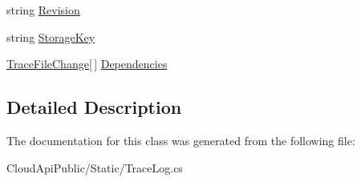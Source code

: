 \begin{DoxyCompactItemize}
\begin{DoxyCompactList}\small\item\em \end{DoxyCompactList}\item 
\hypertarget{class_cloud_api_public_1_1_static_1_1_trace_file_change_a029dfa11d6a6dc91af7f680418234749}{string \hyperlink{class_cloud_api_public_1_1_static_1_1_trace_file_change_a029dfa11d6a6dc91af7f680418234749}{Revision}}\label{class_cloud_api_public_1_1_static_1_1_trace_file_change_a029dfa11d6a6dc91af7f680418234749}

\begin{DoxyCompactList}\small\item\em \end{DoxyCompactList}\item 
\hypertarget{class_cloud_api_public_1_1_static_1_1_trace_file_change_a13935156660db1dd6d25d07a7de376af}{string \hyperlink{class_cloud_api_public_1_1_static_1_1_trace_file_change_a13935156660db1dd6d25d07a7de376af}{Storage\-Key}}\label{class_cloud_api_public_1_1_static_1_1_trace_file_change_a13935156660db1dd6d25d07a7de376af}

\begin{DoxyCompactList}\small\item\em \end{DoxyCompactList}\item 
\hypertarget{class_cloud_api_public_1_1_static_1_1_trace_file_change_ae59a01ca9928f8ffe53da95ff4fa62b1}{\hyperlink{class_cloud_api_public_1_1_static_1_1_trace_file_change}{Trace\-File\-Change}\mbox{[}$\,$\mbox{]} \hyperlink{class_cloud_api_public_1_1_static_1_1_trace_file_change_ae59a01ca9928f8ffe53da95ff4fa62b1}{Dependencies}}\label{class_cloud_api_public_1_1_static_1_1_trace_file_change_ae59a01ca9928f8ffe53da95ff4fa62b1}

\begin{DoxyCompactList}\small\item\em \end{DoxyCompactList}\end{DoxyCompactItemize}


\subsection{Detailed Description}


The documentation for this class was generated from the following file\-:\begin{DoxyCompactItemize}
\item 
Cloud\-Api\-Public/\-Static/Trace\-Log.\-cs\end{DoxyCompactItemize}
